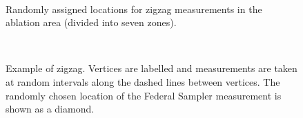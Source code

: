 \documentclass{sfuthesis}
\begin{document}
\begin{landscape}
\begin{figure}
	\centering
	\\
	\caption{Randomly assigned locations for zigzag measurements in the ablation area (divided into seven zones).}
	\label{zigzag_planned}
\end{figure}
\end{landscape}

\begin{figure}
	\centering
	\\
	\caption{Example of zigzag. Vertices are labelled and measurements are taken at random intervals along the dashed lines between vertices. The randomly chosen location of the Federal Sampler measurement is shown as a diamond.}
	\label{zigzag_vertex}
\end{figure}
\end{document}
